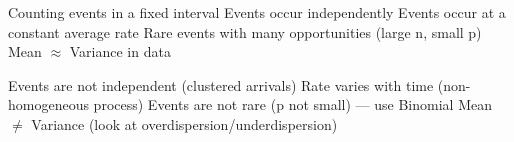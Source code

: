 
\PSyes{} Counting events in a fixed interval\PSbr{}\PSyes{} Events occur independently\PSbr{}\PSyes{} Events occur at a constant average rate\PSbr{}\PSyes{} Rare events with many opportunities (large n, small p)\PSbr{}\PSyes{} Mean \ensuremath{\approx} Variance in data


\PSno{} Events are not independent (clustered arrivals)\PSbr{}\PSno{} Rate varies with time (non-homogeneous process)\PSbr{}\PSno{} Events are not rare (p not small) — use Binomial\PSbr{}\PSno{} Mean \ensuremath{\neq} Variance (look at overdispersion/underdispersion)



